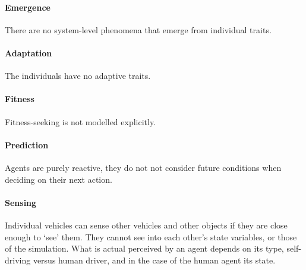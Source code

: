 


\paragraph{Emergence} 
There are no system-level phenomena that emerge from individual traits.

\paragraph{Adaptation} 
The individuals have no adaptive traits.

\paragraph{Fitness} 
Fitness-seeking is not modelled explicitly. 

\paragraph{Prediction} 
Agents are purely reactive, they do not not consider future conditions when deciding on their next action.  

\paragraph{Sensing} 
Individual vehicles can sense other vehicles and other objects if they are close enough to `see' them. They cannot see into each other's state variables, or those of the simulation. What is actual perceived by an agent depends on its type, self-driving versus human driver, and in the case of the human agent its state.

